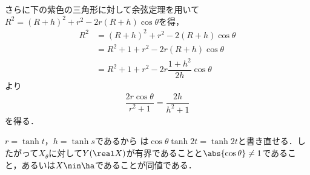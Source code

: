 \begin{npfwn}
  さらに下の紫色の三角形に対して余弦定理を用いて${R^2 = (R+h)^2 + r^2 - 2r(R+h)\cos\theta }$を得，
  \begin{align*}
    R^2 &= (R+h)^2 + r^2 - 2(R+h) \cos\theta \\
        &= R^2 +  1 + r^2 - 2r(R+h) \cos\theta \\
        &= R^2 +  1 + r^2 - 2r\dfrac{1+h^2}{2h} \cos\theta  
  \end{align*}
  より
  \begin{align}
    {\dfrac{2r\cos\theta}{r^2 + 1} = \dfrac{2h}{h^2 + 1} }\label{eq:1018-main}
  \end{align}
  を得る．

  $r = \tanh t$，$h = \tanh s$であるから は$\cos\theta \tanh 2t = \tanh 2t $と書き直せる．したがって$X_{\theta}$に対して$Y(\real X) $が有界であることと$ \abs{\cos\theta}\neq 1 $であること，あるいは$ X\nin \ha  $であることが同値である．
\end{npfwn}

